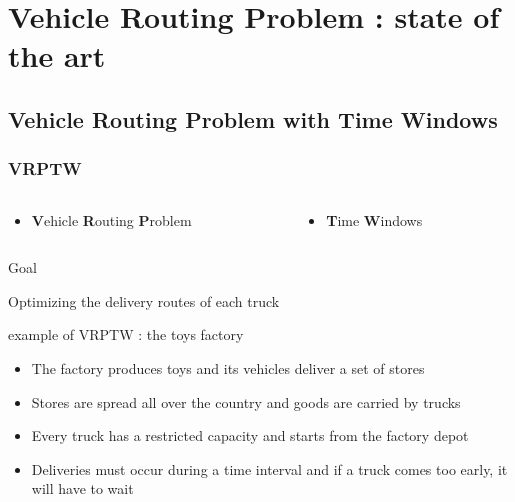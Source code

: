 \documentclass{beamer}
\begin{document}
\section{Vehicle Routing Problem : state of the art}

\subsection*{Vehicle Routing Problem with Time Windows}

\begin{frame}
\frametitle{VRPTW\cite{Berbeglia07}}
	\begin{columns}
	 	\begin{column}[l]{6cm} \begin{center}
			\begin{itemize}
 				\item \textbf{V}ehicle \textbf{R}outing \textbf{P}roblem
			\end{itemize} \end{center}
	 	\end{column}
	 	\begin{column}[r]{6cm} \begin{center}
			\begin{itemize} 
				\item \textbf{T}ime \textbf{W}indows
			\end{itemize} \end{center}
	 	\end{column}
	\end{columns}
	\begin{block}{Goal}
		\begin{center} Optimizing the delivery routes of each truck \end{center}
	\end{block}
		
	\begin{exampleblock}{example of VRPTW : the toys factory}
		\begin{itemize}
			\item The factory produces toys and its vehicles deliver a set of stores
			\item Stores are spread all over the country and goods are carried by trucks
			\item Every truck has a restricted capacity and starts from the factory depot
			\item Deliveries must occur during a time interval and if a truck comes too early, it will have to wait
		\end{itemize}
	\end{exampleblock}
\end{frame}
\end{document}
